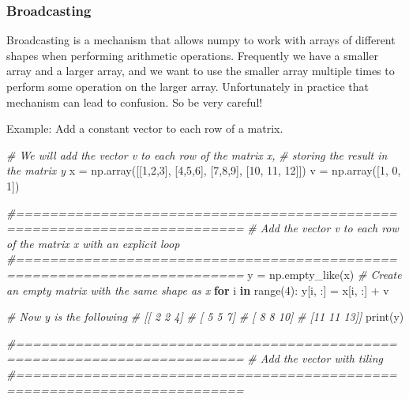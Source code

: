 \documentclass[
]{article}
\newenvironment{Shaded}{}{}
\newcommand{\BuiltInTok}[1]{#1}
\newcommand{\CommentTok}[1]{\textcolor[rgb]{0.38,0.63,0.69}{\textit{#1}}}
\newcommand{\ControlFlowTok}[1]{\textcolor[rgb]{0.00,0.44,0.13}{\textbf{#1}}}
\newcommand{\DecValTok}[1]{\textcolor[rgb]{0.25,0.63,0.44}{#1}}
\newcommand{\KeywordTok}[1]{\textcolor[rgb]{0.00,0.44,0.13}{\textbf{#1}}}
\newcommand{\NormalTok}[1]{#1}
\newcommand{\OperatorTok}[1]{\textcolor[rgb]{0.40,0.40,0.40}{#1}}
\begin{document}
\hypertarget{broadcasting}{%
\subsubsection{Broadcasting}\label{broadcasting}}

Broadcasting is a mechanism that allows numpy to work with arrays of
different shapes when performing arithmetic operations. Frequently we
have a smaller array and a larger array, and we want to use the smaller
array multiple times to perform some operation on the larger array.
Unfortunately in practice that mechanism can lead to confusion. So be
very careful!

Example: Add a constant vector to each row of a matrix.

\begin{Shaded}
\begin{Highlighting}[]
\CommentTok{\# We will add the vector v to each row of the matrix x,}
\CommentTok{\# storing the result in the matrix y}
\NormalTok{x }\OperatorTok{=}\NormalTok{ np.array([[}\DecValTok{1}\NormalTok{,}\DecValTok{2}\NormalTok{,}\DecValTok{3}\NormalTok{], [}\DecValTok{4}\NormalTok{,}\DecValTok{5}\NormalTok{,}\DecValTok{6}\NormalTok{], [}\DecValTok{7}\NormalTok{,}\DecValTok{8}\NormalTok{,}\DecValTok{9}\NormalTok{], [}\DecValTok{10}\NormalTok{, }\DecValTok{11}\NormalTok{, }\DecValTok{12}\NormalTok{]])}
\NormalTok{v }\OperatorTok{=}\NormalTok{ np.array([}\DecValTok{1}\NormalTok{, }\DecValTok{0}\NormalTok{, }\DecValTok{1}\NormalTok{])}

\CommentTok{\#=========================================================================}
\CommentTok{\# Add the vector v to each row of the matrix x with an explicit loop}
\CommentTok{\#=========================================================================}
\NormalTok{y }\OperatorTok{=}\NormalTok{ np.empty\_like(x)   }\CommentTok{\# Create an empty matrix with the same shape as x}
\ControlFlowTok{for}\NormalTok{ i }\KeywordTok{in} \BuiltInTok{range}\NormalTok{(}\DecValTok{4}\NormalTok{):}
\NormalTok{    y[i, :] }\OperatorTok{=}\NormalTok{ x[i, :] }\OperatorTok{+}\NormalTok{ v}

\CommentTok{\# Now y is the following}
\CommentTok{\# [[ 2  2  4]}
\CommentTok{\#  [ 5  5  7]}
\CommentTok{\#  [ 8  8 10]}
\CommentTok{\#  [11 11 13]]}
\BuiltInTok{print}\NormalTok{(y)}

\CommentTok{\#=========================================================================}
\CommentTok{\# Add the vector with tiling}
\CommentTok{\#=========================================================================}


\end{Highlighting}
\end{Shaded}
\end{document}

